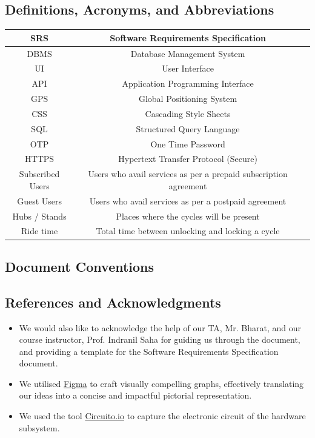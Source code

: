 \documentclass[11pt]{article}
\begin{document}
\subsection{Definitions, Acronyms, and Abbreviations}
\begin{center}
\begin{tabular}{|c|c|p{}}
    \hline
    SRS & Software Requirements Specification \\
    \hline
    DBMS & Database Management System \\
    \hline
    UI & User Interface \\
    \hline
    API & Application Programming Interface \\
    \hline
    GPS & Global Positioning System \\
    \hline
    CSS & Cascading Style Sheets \\
    \hline
    SQL & Structured Query Language \\
    \hline
    OTP & One Time Password \\
    \hline
    HTTPS & Hypertext Transfer Protocol (Secure)\\
    \hline
    Subscribed Users & Users who avail services as per a prepaid subscription agreement \\
    \hline
    Guest Users & Users who avail services as per a postpaid agreement \\
    \hline
    Hubs / Stands & Places where the cycles will be present \\
    \hline
    Ride time & Total time between unlocking and locking a cycle \\
    \hline
\end{tabular}
\end{center}

\subsection{Document Conventions}


\subsection{References and Acknowledgments}
\begin{itemize}
    \item We would also like to acknowledge the help of our TA, Mr. Bharat, and our course instructor, Prof. Indranil Saha for guiding us through the document, and providing a template for the Software Requirements Specification document.
    \item We utilised \href{https://www.figma.com/}{Figma} to craft visually compelling graphs, effectively translating our ideas into a concise and impactful pictorial representation.
    \item We used the tool \href{https://www.circuito.io/}{Circuito.io} to capture the electronic circuit of the hardware subsystem.
\end{itemize}
\end{document}
